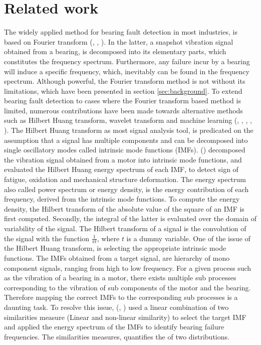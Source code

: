 \documentclass[../Main/thesis.tex]{subfiles}
\begin{document}
\section{Related work}
\label{sec:relatedwork}
The widely applied method for bearing fault detection in most industries, is based on Fourier transform (\cite{gupta2016}, \cite{khadersab2018}, \cite{randal2010}). In the latter, a snapshot vibration signal obtained from a bearing, is decomposed into its elementary parts, which constitutes the frequency spectrum. Furthermore, any failure incur by a bearing will induce a specific frequency, which, inevitably can be found in the frequency spectrum.
\justify
Although powerful, the Fourier transform method is not without its limitations, which have been presented in section \ref{sec:background}. To extend bearing fault detection to cases where the Fourier transform based method is limited,
numerous contributions have been made towards alternative methods such as Hilbert Huang transform, wavelet transform and machine learning (\cite{zhang2019}, \cite{xiaoan2018}, \cite{rai2016}, \cite{konar2011}, \cite{rai2006} ).
\justify
The Hilbert Huang transform as most signal analysis tool, is predicated on the assumption that a signal has multiple components and can be decomposed into single oscillatory modes called intrinsic mode functions (IMFs). 
(\cite{fan2016}) decomposed the vibration signal obtained from a motor into intrinsic mode functions, and evaluated the Hilbert Huang energy spectrum of each IMF, to detect sign of fatigue, oxidation and mechanical structure deformation. The energy spectrum also called power spectrum or energy density, is the energy contribution of each frequency, derived from the intrinsic mode functions.
To compute the energy density, the Hilbert transform of the absolute value of the square of an IMF is first computed. Secondly, the integral of the latter is evaluated over the domain of variability of the signal. The Hilbert transform of a signal is the convolution of the signal with the function $\frac{1}{\pi t}$, where $t$ is a dummy variable.
\justify
One of the issue of the Hilbert Huang transform, is selecting the appropriate intrinsic mode functions. The IMFs obtained from a target signal, are hierarchy of mono component signals, ranging from high to low frequency. For a given process such as the vibration of a bearing in a motor, there exists multiple sub processes corresponding to the vibration of sub components of the motor and the bearing. Therefore mapping the correct IMFs to the corresponding sub processes is a daunting task. To resolve this issue, (\cite{osman2013a}, \cite{osman2013b} ) used a linear combination of two similarities measure (Linear and non-linear similarity) to select the target IMF and applied the energy spectrum of the IMFs to identify bearing failure frequencies. The similarities measures, quantifies the  of two distributions.
\end{document}
